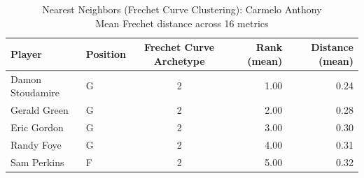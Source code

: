 \begin{table}[t]
\caption*{
{\fontsize{20}{25} Nearest Neighbors (Frechet Curve Clustering): Carmelo Anthony\fontsize{12}{15}\selectfont } \\ 
{\fontsize{14}{17}\selectfont  Mean Frechet distance across 16 metrics\fontsize{12}{15}\selectfont }
} 
\fontsize{12.0pt}{14.0pt}\selectfont
\begin{tabular*}{\linewidth}{@{\extracolsep{\fill}}llcrr}
\toprule
Player & Position & Frechet Curve Archetype & Rank (mean) & Distance (mean) \\ 
\midrule\addlinespace[2.5pt]
Damon Stoudamire & G & 2 & 1.00 & 0.24 \\ 
Gerald Green & G & 2 & 2.00 & 0.28 \\ 
Eric Gordon & G & 2 & 3.00 & 0.30 \\ 
Randy Foye & G & 2 & 4.00 & 0.31 \\ 
Sam Perkins & F & 2 & 5.00 & 0.32 \\ 
\bottomrule
\end{tabular*}
\end{table}

